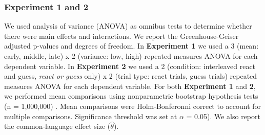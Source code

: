 \documentclass[man,donotrepeattitle,floatsintext,letterpaper,12pt]{apa7}
\newcommand\boldblue[1]{\textcolor{mydarkblue}{\textbf{#1}}}
\begin{document}
\subsubsection{Experiment 1 and 2}

\noindent We used analysis of variance (ANOVA) as omnibus tests to determine whether there were main effects and interactions. We report the Greenhouse-Geiser adjusted p-values and degrees of freedom. In \boldblue{Experiment 1} we used a 3 (mean: early, middle, late) x 2 (variance: low, high) repeated measures ANOVA for each dependent variable. In \boldblue{Experiment 2} we used a 2 (condition: interleaved react and guess, \emph{react or guess} only) x 2 (trial type: react trials, guess trials) repeated measures ANOVA for each dependent variable. For both \boldblue{Experiment 1} and \boldblue{2}, we performed mean comparisons using nonparametric bootstrap hypothesis tests (n = 1,000,000) \autocite{hesterbergBootstrap2011,cashabackDissociatingErrorbasedReinforcementbased2017,cashabackGradientReinforcementLandscape2019a}. Mean comparisons were Holm-Bonferonni correct to account for multiple comparisons. Significance threshold was set at $\alpha$ = 0.05). We also report the common-language effect size ($\hat{\theta}$).

\newpage
\begin{nolinenumbers}

    \printbibliography[title=\textcolor{mydarkblue}{References}]

\end{nolinenumbers}

% 
\end{document}
